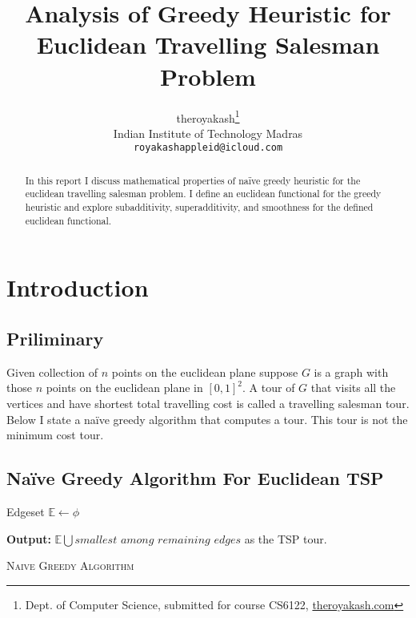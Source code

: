 \documentclass{article}
\title{Analysis of Greedy Heuristic for Euclidean Travelling Salesman Problem}
\author{
    theroyakash\thanks{Dept. of Computer Science, submitted for course \sf CS6122, \href{https://theroyakash.com}{theroyakash.com}}\\
    Indian Institute of Technology Madras \\
    \texttt{royakashappleid@icloud.com} \\
}
\begin{document}
\maketitle

\begin{abstract}
In this report I discuss mathematical properties of 
naïve greedy heuristic for the euclidean travelling salesman problem. 
I define an euclidean functional for the greedy heuristic and explore 
subadditivity, superadditivity, and smoothness for the defined 
euclidean functional.
\end{abstract}

\section{Introduction}
\subsection{Priliminary}
Given collection of $n$ points on the euclidean plane suppose $G$ is a graph with those $n$ points on the euclidean plane in $[0,1]^2$. A tour of $G$ that visits all the vertices and have shortest total travelling cost is called a travelling salesman tour. Below I state a naïve greedy algorithm that computes a tour.
This tour is not the minimum cost tour.

\subsection{Naïve Greedy Algorithm For Euclidean TSP}

\begin{algorithm}[H]
    \label{alg:1}
    
    \BlankLine
    Edgeset $\mathbb{E} \gets \phi$\\

    \textbf{Output: } $\mathbb{E} \bigcup \textit{smallest among remaining edges}$ as the TSP tour.
    
    \caption{\textsc{Naive Greedy Algorithm}}
\end{algorithm}
\end{document}
